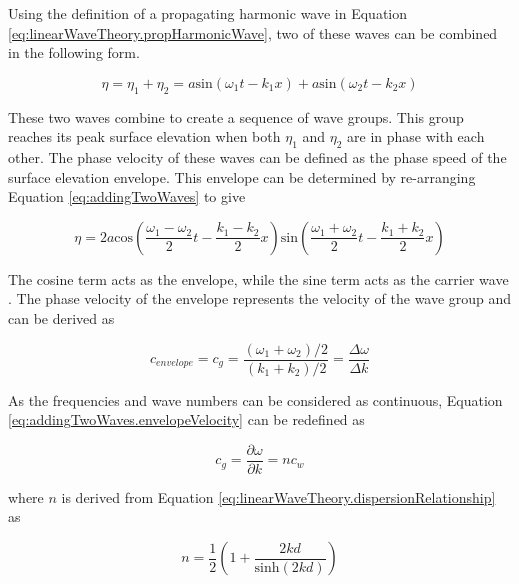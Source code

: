 Using the definition of a propagating harmonic wave in Equation \ref{eq:linearWaveTheory.propHarmonicWave}, two of these waves can be combined in the following form.

\begin{equation} \label{eq:addingTwoWaves}
    \eta = \eta_{1} + \eta_{2} = a\text{sin}(\omega_{1}t - k_{1}x) + a\text{sin}(\omega_{2}t - k_{2}x)
\end{equation}

These two waves combine to create a sequence of wave groups. This group reaches its peak surface elevation when both $\eta_{1}$ and $\eta_{2}$ are in phase with each other. The phase velocity of these waves can be defined as the phase speed of the surface elevation envelope. This envelope can be determined by re-arranging Equation \ref{eq:addingTwoWaves} to give

\begin{equation} \label{eq:addingTwoWaves.envelopeForm}
    \eta =  2a\text{cos} \left ( \frac{\omega_{1} - \omega_{2}}{2}t - \frac{k_{1} - k_{2}}{2}x \right ) \text{sin} \left ( \frac{\omega_{1} + \omega_{2}}{2}t - \frac{k_{1} + k_{2}}{2}x  \right )
\end{equation}

The cosine term acts as the envelope, while the sine term acts as the carrier wave \cite{Holthuijsen2007}. The phase velocity of the envelope represents the velocity of the wave group and can be derived as

\begin{equation} \label{eq:addingTwoWaves.envelopeVelocity}
    c_{envelope} = c_{g} = \frac{(\omega_{1} + \omega_{2})/2}{(k_1 + k_2)/2} = \frac{\Delta \omega}{\Delta k}
\end{equation}

As the frequencies and wave numbers can be considered as continuous, Equation \ref{eq:addingTwoWaves.envelopeVelocity} can be redefined as

\begin{equation} \label{eq:addingTwoWaves.groupVelocity}
    c_{g} = \frac{\partial \omega}{\partial k} = nc_{w}
\end{equation}

where $n$ is derived from Equation \ref{eq:linearWaveTheory.dispersionRelationship} as 

\begin{equation} \label{eq:addingTwoWaves.n}
    n = \frac{1}{2} \left ( 1+ \frac{2kd}{\text{sinh}(2kd)} \right )
\end{equation}

